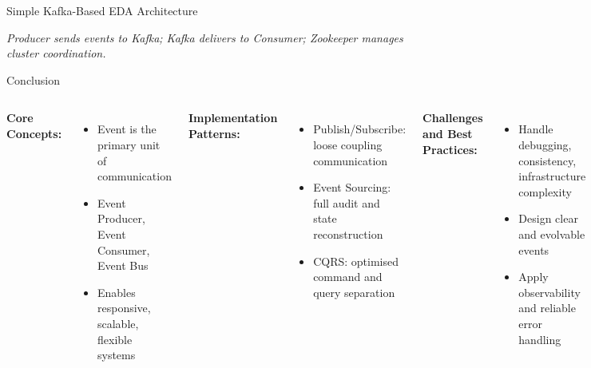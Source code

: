 \documentclass[aspectratio=169, table]{beamer}
\begin{document}
\begin{frame}[fragile]{Simple Kafka-Based EDA Architecture}
	\vspace{20pt}
	\centering
	
	\scriptsize \textit{Producer sends events to Kafka; Kafka delivers to Consumer; Zookeeper manages cluster coordination.}
\end{frame}

	
	
	\begin{frame}[fragile]{Conclusion}
		\vspace{20pt}
		\begin{columns}[T]
			\textbf{Core Concepts:}
			\begin{itemize}
				\item Event is the primary unit of communication
				\item Event Producer, Event Consumer, Event Bus
				\item Enables responsive, scalable, flexible systems
			\end{itemize}
			
			\textbf{Implementation Patterns:}
			\begin{itemize}
				\item Publish/Subscribe: loose coupling communication
				\item Event Sourcing: full audit and state reconstruction
				\item CQRS: optimised command and query separation
			\end{itemize}
			
			\textbf{Challenges and Best Practices:}
			\begin{itemize}
				\item Handle debugging, consistency, infrastructure complexity
				\item Design clear and evolvable events
				\item Apply observability and reliable error handling
			\end{itemize}
		\end{columns}
	\end{frame}
	
\end{document}
